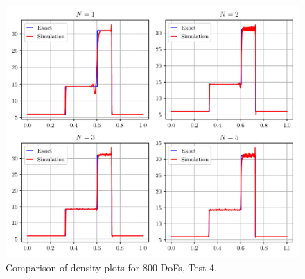 \documentclass[a4paper,11pt,oneside]{article}
\begin{document}
\begin{figure}[htbp]
	\includegraphics[width=\linewidth]{figures/riemann_1d/test1-4/dof800_12_12_chandrashekhar.pdf}
	\caption{Comparison of density plots for 800 DoFs, Test 4.}
	\label{fig:test1-4_dof800_chandrashekhar}
\end{figure}
\end{document}
